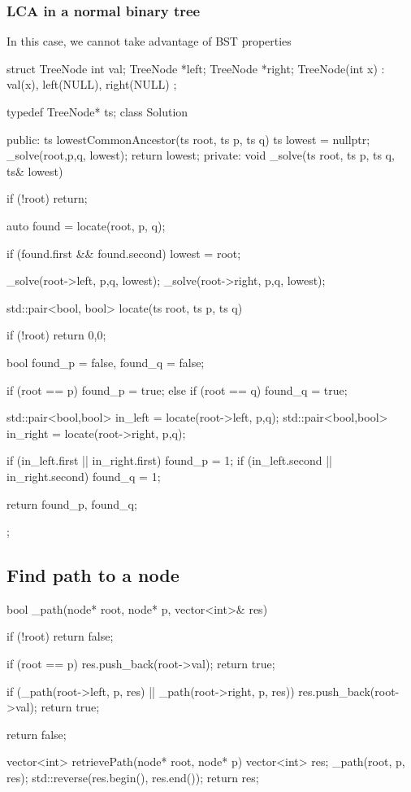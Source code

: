 \documentclass{report}
\begin{document}
\pagebreak 
\bigbreak \noindent 
\subsubsection{LCA in a normal binary tree}
\bigbreak \noindent 
In this case, we cannot take advantage of BST properties
\bigbreak \noindent 
\begin{cppcode}
struct TreeNode {
    int val;
    TreeNode *left;
    TreeNode *right;
    TreeNode(int x) : val(x), left(NULL), right(NULL) {}
};

typedef TreeNode* ts;
class Solution {
public:
    ts lowestCommonAncestor(ts root, ts p, ts q) {
        ts lowest = nullptr;
        _solve(root,p,q, lowest);
        return lowest;
    }
private:
    void _solve(ts root, ts p, ts q, ts& lowest) {
        if (!root) return; 

        auto found = locate(root, p, q);

        if (found.first && found.second) lowest = root;

        _solve(root->left, p,q, lowest);
        _solve(root->right, p,q, lowest);

    }
    std::pair<bool, bool> locate(ts root, ts p, ts q) {
        if (!root) return {0,0};

        bool found_p = false, found_q = false;

        if (root == p) {
            found_p = true;
        }
        else if (root == q)  {
            found_q = true;
        }

        std::pair<bool,bool> in_left = locate(root->left, p,q);
        std::pair<bool,bool> in_right = locate(root->right, p,q);

        if (in_left.first || in_right.first) found_p = 1;
        if (in_left.second || in_right.second) found_q = 1;

        return {found_p, found_q};
    }
};
\end{cppcode}

\pagebreak 
\subsection{Find path to a node}
\bigbreak \noindent 
\begin{cppcode}
    bool _path(node* root, node* p, vector<int>& res) {
        if (!root) return false;

        if (root == p) {
            res.push_back(root->val);
            return true;
        }

        if (_path(root->left, p, res) || _path(root->right, p, res)) {
            res.push_back(root->val);
            return true;
        }

        return false;
    }

    vector<int> retrievePath(node* root, node* p) {
        vector<int> res;
        _path(root, p, res);
        std::reverse(res.begin(), res.end());
        return res;
    }
\end{cppcode}
\end{document}
